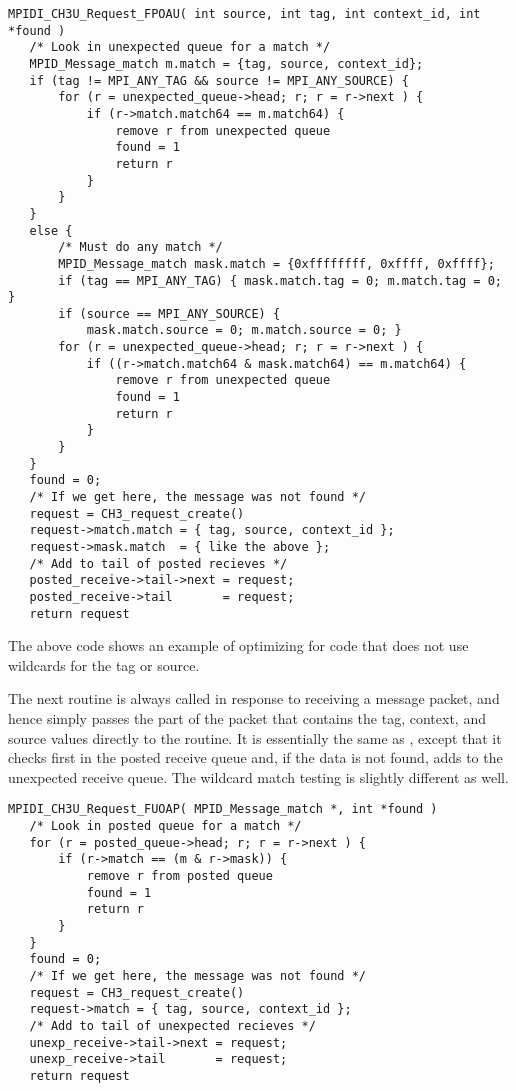 \documentclass{article}
\begin{document}
\begin{verbatim}
MPIDI_CH3U_Request_FPOAU( int source, int tag, int context_id, int *found )
   /* Look in unexpected queue for a match */
   MPID_Message_match m.match = {tag, source, context_id};
   if (tag != MPI_ANY_TAG && source != MPI_ANY_SOURCE) {
       for (r = unexpected_queue->head; r; r = r->next ) {
           if (r->match.match64 == m.match64) {
               remove r from unexpected queue
               found = 1
               return r
           }
       }
   }
   else {
       /* Must do any match */
       MPID_Message_match mask.match = {0xffffffff, 0xffff, 0xffff};
       if (tag == MPI_ANY_TAG) { mask.match.tag = 0; m.match.tag = 0; }
       if (source == MPI_ANY_SOURCE) { 
           mask.match.source = 0; m.match.source = 0; }
       for (r = unexpected_queue->head; r; r = r->next ) {
           if ((r->match.match64 & mask.match64) == m.match64) {
               remove r from unexpected queue
               found = 1
               return r
           }
       }
   }
   found = 0;
   /* If we get here, the message was not found */
   request = CH3_request_create()
   request->match.match = { tag, source, context_id };
   request->mask.match  = { like the above };
   /* Add to tail of posted recieves */
   posted_receive->tail->next = request;
   posted_receive->tail       = request;
   return request
\end{verbatim}
The above code shows an example of optimizing for code that does not
use wildcards for the tag or source.  

The next routine is always called in response to receiving a message packet,
and hence simply passes the part of the packet that contains the tag, context,
and source values directly to the routine.  It is essentially the same as 
, except that it checks first in the posted
receive queue and, if the data is not found, adds to the unexpected receive
queue.  The wildcard match testing is slightly different as well.
\begin{verbatim}
MPIDI_CH3U_Request_FUOAP( MPID_Message_match *, int *found )
   /* Look in posted queue for a match */
   for (r = posted_queue->head; r; r = r->next ) {
       if (r->match == (m & r->mask)) {
           remove r from posted queue
           found = 1
           return r
       }
   }
   found = 0;
   /* If we get here, the message was not found */
   request = CH3_request_create()
   request->match = { tag, source, context_id };
   /* Add to tail of unexpected recieves */
   unexp_receive->tail->next = request;
   unexp_receive->tail       = request;
   return request
\end{verbatim}
\end{document}
